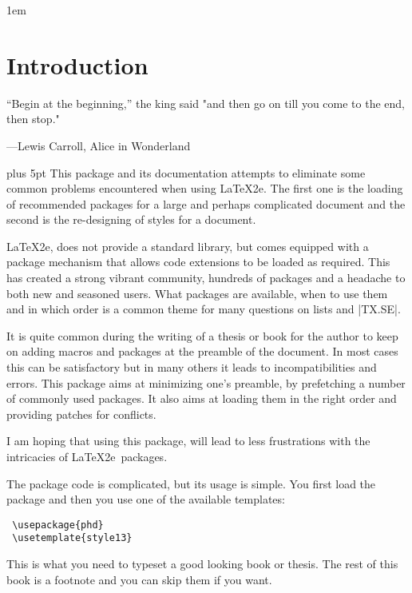 \parindent1em

\chapter{Introduction}


\epigraph{``Begin at the beginning,'' the king said
"and then go on till you come to the end, then stop."}{
---Lewis Carroll, Alice in Wonderland}

 \parskip3pt plus 5pt 
\noindent This package and its documentation attempts to eliminate some common 
problems encountered when using \LaTeX2e. The first one is the loading of 
recommended packages for a large and perhaps complicated document and 
the second is the re-designing of styles for a document.

 \LaTeX2e, does not provide a standard library, but comes equipped with
 a package mechanism that allows code extensions to be loaded as required.
 This has created a strong vibrant community, hundreds of packages and a 
 headache to both new and seasoned users. What packages are available, when
 to use them and in which order is a common theme for many questions on
 lists and |TX.SE|.

 It is quite common during the writing of a thesis or book
 for the author to keep on adding macros and packages
 at the preamble of the document. In most cases this can
 be satisfactory but in many others it leads to
 incompatibilities and errors. This package aims at
 minimizing one's preamble, by prefetching a number of
 commonly used packages. It also aims at loading them
 in the right order and providing patches for conflicts.
 
 I am hoping that using this package, will lead to less
 frustrations with the intricacies of \LaTeX2e\ packages.

The package code is complicated, but its usage is simple. You first load the package and then
you use one of the available templates:

 \begin{commands}[]{}
 \begin{verbatim}
 \usepackage{phd}
 \usetemplate{style13}
 \end{verbatim}
 \end{commands}

This is what you need to typeset a good looking book or thesis. The rest of this book is a footnote and you can skip them if you want. 

